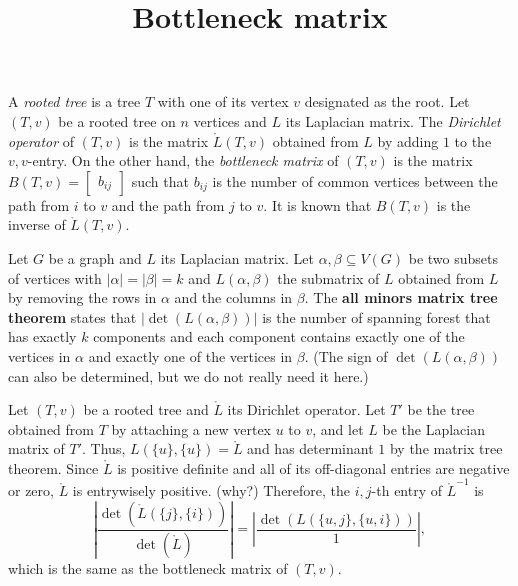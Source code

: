 \documentclass{article}
\title{Bottleneck matrix}
\date{\vspace{-1cm}}
\newcommand{\rL}{\mathring{L}}
\theoremstyle{definition}
\begin{document}
\maketitle
\large

A \emph{rooted tree} is a tree $T$ with one of its vertex $v$ designated as the root.  Let $(T,v)$ be a rooted tree on $n$ vertices and $L$ its Laplacian matrix.  The \emph{Dirichlet operator} of $(T,v)$ is the matrix $\rL(T,v)$ obtained from $L$ by adding $1$ to the $v,v$-entry.  On the other hand, the \emph{bottleneck matrix} of $(T,v)$ is the matrix $B(T,v) = \begin{bmatrix} b_{ij} \end{bmatrix}$ such that $b_{ij}$ is the number of common vertices between the path from $i$ to $v$ and the path from $j$ to $v$.  It is known that $B(T,v)$ is the inverse of $\rL(T,v)$.  

Let $G$ be a graph and $L$ its Laplacian matrix.  Let $\alpha,\beta\subseteq V(G)$ be two subsets of vertices with $|\alpha| = |\beta| = k$ and $L(\alpha,\beta)$ the submatrix of $L$ obtained from $L$ by removing the rows in $\alpha$ and the columns in $\beta$.  The \textbf{all minors matrix tree theorem} states that $|\det(L(\alpha,\beta))|$ is the number of spanning forest that has exactly $k$ components and each component contains exactly one of the vertices in $\alpha$ and exactly one of the vertices in $\beta$.  (The sign of $\det(L(\alpha,\beta))$ can also be determined, but we do not really need it here.) 

Let $(T,v)$ be a rooted tree and $\rL$ its Dirichlet operator.  Let $T'$ be the tree obtained from $T$ by attaching a new vertex $u$ to $v$, and let $L$ be the Laplacian matrix of $T'$.  Thus, $L(\{u\},\{u\}) = \rL$ and has determinant $1$ by the matrix tree theorem.  Since $\rL$ is positive definite and all of its off-diagonal entries are negative or zero, $\rL$ is entrywisely positive. (why?)  Therefore, the $i,j$-th entry of $\rL^{-1}$ is 
\[\left|\frac{\det(\rL(\{j\},\{i\}))}{\det(\rL)}\right| = 
\left|\frac{\det(L(\{u,j\},\{u,i\}))}{1}\right|
,\]
which is the same as the bottleneck matrix of $(T,v)$.
\end{document}

